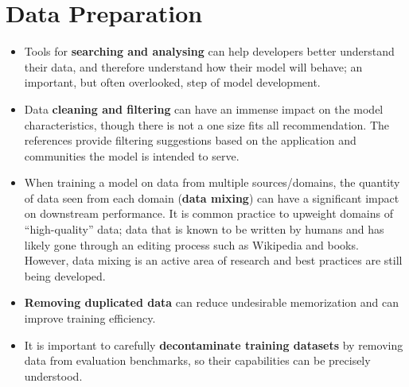 \section{Data Preparation}
\label{sec:data-prep}

\begin{tcolorbox}[
    width=\textwidth,
    title={Data Preparation Best Practices},
    colback=backgroundcol, %
    colframe=darkgray, %
    colbacktitle=dataprep, %
    coltitle=white, %
    coltext=black %
]

\begin{itemize}[itemsep=0pt, wide=3pt]
    \item Tools for \textbf{searching and analysing} can help developers better understand their data, and therefore understand how their model will behave; an important, but often overlooked, step of model development.
    \item Data \textbf{cleaning and filtering} can have an immense impact on the model characteristics, though there is not a one size fits all recommendation. The references provide filtering suggestions based on the application and communities the model is intended to serve.
    \item When training a model on data from multiple sources/domains, the quantity of data seen from each domain (\textbf{data mixing}) can have a significant impact on downstream performance. It is common practice to upweight domains of ``high-quality'' data; data that is known to be written by humans and has likely gone through an editing process such as Wikipedia and books. However, data mixing is an active area of research and best practices are still being developed.
    \item \textbf{Removing duplicated data} can reduce undesirable memorization and can improve training efficiency.
    \item It is important to carefully \textbf{decontaminate training datasets} by removing data from evaluation benchmarks, so their capabilities can be precisely understood.
\end{itemize}
\end{tcolorbox}

